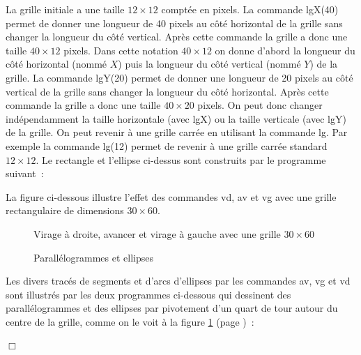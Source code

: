  La grille initiale a une taille $12 \times 12$ comptée en pixels. La commande {\idt lgX(40)} permet de donner
 une longueur de 40 pixels au côté horizontal de la grille sans changer la longueur du côté vertical. Après
 cette commande la grille a donc une taille $40 \times 12$ pixels. Dans cette notation $40 \times 12$ on donne
 d'abord la longueur du côté horizontal (nommé $X$) puis la longueur du côté vertical (nommé $Y$)
 de la grille. La commande {\idt lgY(20)} permet de donner
 une longueur de 20 pixels au côté vertical de la grille sans changer la longueur du côté horizontal. Après
 cette commande la grille a donc une taille $40 \times 20$ pixels. On peut donc changer indépendamment la
  taille horizontale (avec {\idt lgX}) ou la taille verticale (avec {\idt lgY}) de la grille. 
  On peut revenir à une grille carrée en utilisant la commande {\idt lg}.
  Par exemple la commande {\idt lg(12)}
  permet de revenir à une grille carrée standard $12 \times 12$. Le rectangle et l'ellipse
 ci-dessus 
  sont construits par le programme suivant~:\hfill
 
 
 La figure 
 ci-dessous
illustre l'effet des commandes
 {\idt vd},  {\idt av} et {\idt vg} avec une grille rectangulaire de dimensions $30 \times 60$.
\begin{figure}[htbp]
 \caption{Virage  à droite, avancer et virage à gauche avec une grille $30 \times 60$}
\end{figure}
\begin{figure}[htbp]
 \caption{Parallélogrammes et ellipses}
 \label{fig:parel}
\end{figure}
\begin{exemple}{\rm 
\renewcommand{\carrenoir}{\hspace{-4mm}\rule{1.5mm}{1.5mm}\hspace{2.5mm}}
Les divers tracés de segments et d'arcs d'el\-lip\-ses par les commandes {\idt av}, {\idt vg} 
et {\idt vd} sont illustrés par les deux programmes ci-dessous qui dessinent des parallélogrammes et
des ellipses par pivotement d'un quart de tour autour du centre de la grille, comme on le voit à la 
fi\-gu\-re \ref{fig:parel} (page \pageref{fig:parel})~:\hfill


\renewcommand{\carrenoir}{}
\noindent $\Box$}\end{exemple}

